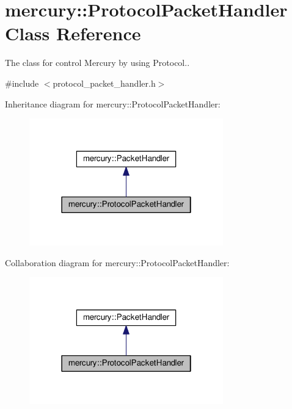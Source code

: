 \hypertarget{classmercury_1_1_protocol_packet_handler}{}\section{mercury\+:\+:Protocol\+Packet\+Handler Class Reference}
\label{classmercury_1_1_protocol_packet_handler}


The class for control Mercury by using Protocol..  




{\ttfamily \#include $<$protocol\+\_\+packet\+\_\+handler.\+h$>$}



Inheritance diagram for mercury\+:\+:Protocol\+Packet\+Handler\+:
\nopagebreak
\begin{figure}[H]
\begin{center}
\leavevmode
\includegraphics[width=238pt]{classmercury_1_1_protocol_packet_handler__inherit__graph}
\end{center}
\end{figure}


Collaboration diagram for mercury\+:\+:Protocol\+Packet\+Handler\+:
\nopagebreak
\begin{figure}[H]
\begin{center}
\leavevmode
\includegraphics[width=238pt]{classmercury_1_1_protocol_packet_handler__coll__graph}
\end{center}
\end{figure}
